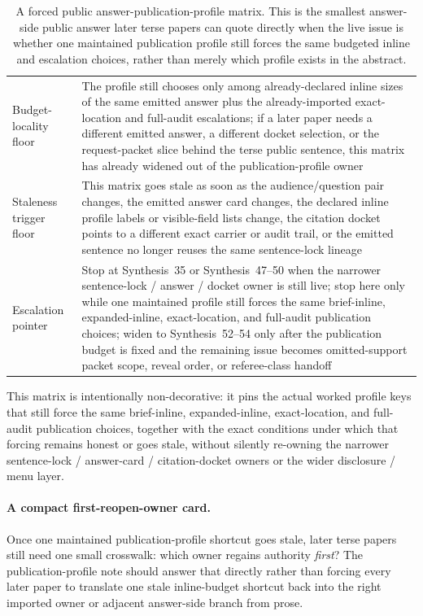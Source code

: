 \documentclass[11pt]{article}
\begin{document}
\begin{table}[t]
\begin{tabularx}{\linewidth}{@{}lX@{}}
Budget-locality floor & The profile still chooses only among already-declared inline sizes of the same emitted answer plus the already-imported exact-location and full-audit escalations; if a later paper needs a different emitted answer, a different docket selection, or the request-packet slice behind the terse public sentence, this matrix has already widened out of the publication-profile owner \\
Staleness trigger floor & This matrix goes stale as soon as the audience/question pair changes, the emitted answer card changes, the declared inline profile labels or visible-field lists change, the citation docket points to a different exact carrier or audit trail, or the emitted sentence no longer reuses the same sentence-lock lineage \\
Escalation pointer & Stop at Synthesis~35 or Synthesis~47--50 when the narrower sentence-lock / answer / docket owner is still live; stop here only while one maintained profile still forces the same brief-inline, expanded-inline, exact-location, and full-audit publication choices; widen to Synthesis~52--54 only after the publication budget is fixed and the remaining issue becomes omitted-support packet scope, reveal order, or referee-class handoff \\
\bottomrule
\end{tabularx}
\caption{A forced public answer-publication-profile matrix. This is the smallest answer-side public answer later terse papers can quote directly when the live issue is whether one maintained publication profile still forces the same budgeted inline and escalation choices, rather than merely which profile exists in the abstract.}
\label{tab:forced-public-answer-publication-profile-matrix}
\end{table}

This matrix is intentionally non-decorative: it pins the actual worked profile keys that still force the same brief-inline, expanded-inline, exact-location, and full-audit publication choices, together with the exact conditions under which that forcing remains honest or goes stale, without silently re-owning the narrower sentence-lock / answer-card / citation-docket owners or the wider disclosure / menu layer.\cite{series:workedexample}


\paragraph{A compact first-reopen-owner card.}
Once one maintained publication-profile shortcut goes stale, later terse papers still need one small crosswalk: which owner regains authority \emph{first}? The publication-profile note should answer that directly rather than forcing every later paper to translate one stale inline-budget shortcut back into the right imported owner or adjacent answer-side branch from prose.
\end{document}
